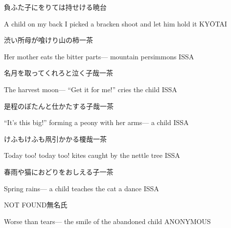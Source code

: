 \begin{haiku}
    {\FH 負ふた子にをりては持せける}\hfill{\FH 暁台}

    \vin{} A child on my back
    \vin{} \vin{} I picked a bracken shoot
    \vin{} \vin{} \vin{} and let him hold it \hspace{\fill} KY\={O}TAI
\end{haiku}

\begin{haiku}
    {\FH 渋い所母が喰けり山の柿}\hfill{\FH 一茶}

    \vin{} Her mother eats
    \vin{} \vin{} the bitter parts---
    \vin{} \vin{} \vin{} mountain persimmons \hspace{\fill} ISSA
\end{haiku}

\begin{haiku}
    {\FH 名月を取ってくれろと泣く子哉}\hfill{\FH 一茶}

    \vin{} The harvest moon---
    \vin{} \vin{} ``Get it for me!''
    \vin{} \vin{} \vin{} cries the child \hspace{\fill} ISSA
\end{haiku}

\begin{haiku}
    {\FH 是程のぼたんと仕かたする子哉}\hfill{\FH 一茶}

    \vin{} ``It's this big!''
    \vin{} \vin{} forming a peony with her arms---
    \vin{} \vin{} \vin{} a child \hspace{\fill} ISSA
\end{haiku}

\begin{haiku}
    {\FH けふもけふも凧引かかる榎哉}\hfill{\FH 一茶}

    \vin{} Today too!
    \vin{} \vin{} today too! kites caught
    \vin{} \vin{} \vin{} by the nettle tree \hspace{\fill} ISSA
\end{haiku}

\begin{haiku}
    {\FH 春雨や猫におどりをおしえる子}\hfill{\FH 一茶}

    \vin{} Spring rains---
    \vin{} \vin{} a child teaches the cat
    \vin{} \vin{} \vin{} a dance \hspace{\fill} ISSA
\end{haiku}

\begin{haiku}
    {NOT FOUND}\hfill{\FH 無名氏}

    \vin{} Worse than tears---
    \vin{} \vin{} the smile of the
    \vin{} \vin{} \vin{} abandoned child \hspace{\fill} ANONYMOUS
\end{haiku}


